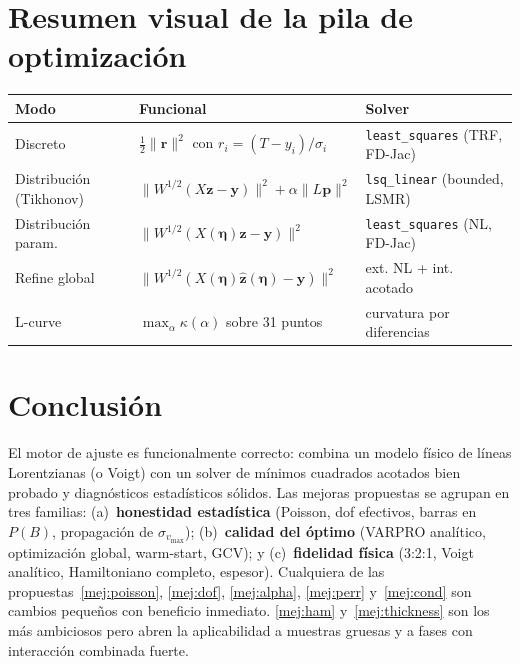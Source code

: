 \documentclass[11pt,a4paper]{article}
\newcommand{\code}[1]{\texttt{\small #1}}
\begin{document}
\section{Resumen visual de la pila de optimización}

\begin{center}
\begin{tabular}{@{}lll@{}}
\toprule
\textbf{Modo} & \textbf{Funcional} & \textbf{Solver} \\
\midrule
Discreto & $\tfrac12\|\bm r\|^{2}$ con $r_i=(T-y_i)/\sigma_i$ & \code{least\_squares} (TRF, FD-Jac) \\
Distribución (Tikhonov) & $\|W^{1/2}(X\bm z-\bm y)\|^{2}+\alpha\|L\bm p\|^{2}$ & \code{lsq\_linear} (bounded, LSMR) \\
Distribución param. & $\|W^{1/2}(X(\bm\eta)\bm z-\bm y)\|^{2}$ & \code{least\_squares} (NL, FD-Jac) \\
Refine global & $\|W^{1/2}(X(\bm\eta)\hat{\bm z}(\bm\eta)-\bm y)\|^{2}$ & ext. NL + int. acotado \\
L-curve & $\max_\alpha\kappa(\alpha)$ sobre 31 puntos & curvatura por diferencias \\
\bottomrule
\end{tabular}
\end{center}

\section{Conclusión}
El motor de ajuste es funcionalmente correcto: combina un modelo físico de líneas Lorentzianas (o Voigt) con un solver de mínimos cuadrados acotados bien probado y diagnósticos estadísticos sólidos. Las mejoras propuestas se agrupan en tres familias: (a)~\textbf{honestidad estadística} (Poisson, dof efectivos, barras en $P(B)$, propagación de $\sigma_{v_{\max}}$); (b)~\textbf{calidad del óptimo} (VARPRO analítico, optimización global, warm-start, GCV); y (c)~\textbf{fidelidad física} (3:2:1, Voigt analítico, Hamiltoniano completo, espesor). Cualquiera de las propuestas~\ref{mej:poisson}, \ref{mej:dof}, \ref{mej:alpha}, \ref{mej:perr} y~\ref{mej:cond} son cambios pequeños con beneficio inmediato. \ref{mej:ham} y~\ref{mej:thickness} son los más ambiciosos pero abren la aplicabilidad a muestras gruesas y a fases con interacción combinada fuerte.
\end{document}
